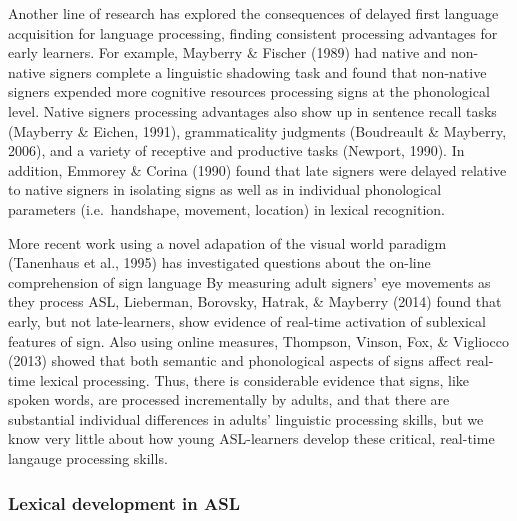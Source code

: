 \documentclass[12pt,]{article}
\begin{document}
Another line of research has explored the consequences of delayed first
language acquisition for language processing, finding consistent
processing advantages for early learners. For example, Mayberry \&
Fischer (1989) had native and non-native signers complete a linguistic
shadowing task and found that non-native signers expended more cognitive
resources processing signs at the phonological level. Native signers
processing advantages also show up in sentence recall tasks (Mayberry \&
Eichen, 1991), grammaticality judgments (Boudreault \& Mayberry, 2006),
and a variety of receptive and productive tasks (Newport, 1990). In
addition, Emmorey \& Corina (1990) found that late signers were delayed
relative to native signers in isolating signs as well as in individual
phonological parameters (i.e.~handshape, movement, location) in lexical
recognition.

More recent work using a novel adapation of the visual world paradigm
(Tanenhaus et al., 1995) has investigated questions about the on-line
comprehension of sign language By measuring adult signers' eye movements
as they process ASL, Lieberman, Borovsky, Hatrak, \& Mayberry (2014)
found that early, but not late-learners, show evidence of real-time
activation of sublexical features of sign. Also using online measures,
Thompson, Vinson, Fox, \& Vigliocco (2013) showed that both semantic and
phonological aspects of signs affect real-time lexical processing. Thus,
there is considerable evidence that signs, like spoken words, are
processed incrementally by adults, and that there are substantial
individual differences in adults' linguistic processing skills, but we
know very little about how young ASL-learners develop these critical,
real-time langauge processing skills.

\subsubsection{Lexical development in
ASL}\label{lexical-development-in-asl}
\end{document}
